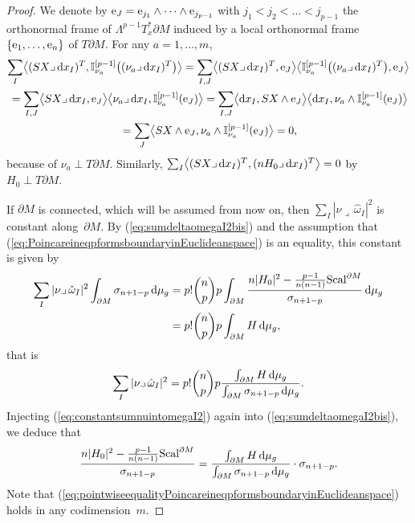 \begin{proof}
We denote by ${\rm e}_J={\rm e}_{j_1}\wedge\dots \wedge {\rm e}_{j_{p-1}}$ with $j_1<j_2<\dots<j_{p-1}$ the orthonormal frame of $\Lambda^{p-1}T_x^*\partial M$ induced by a local orthonormal frame $\{{\rm e}_1,\dots,{\rm e}_n\}$ of $T\partial M$.
For any $a=1,\dots,m$,
\begin{gather*}
\sum_I\bigl\langle (SX\lrcorner\,{\rm d}x_I)^T,\mathbb{I}_{\nu_a}^{[p-1]}\bigl((\nu_a\lrcorner\,{\rm d}x_I)^T\bigr)\bigr\rangle=\sum_{I,J}\bigl\langle (SX\lrcorner\,{\rm d}x_I)^T,{\rm e}_J\bigr\rangle \bigl\langle \mathbb{I}_{\nu_a}^{[p-1]}\bigl((\nu_a\lrcorner\,{\rm d}x_I)^T\bigr),{\rm e}_J\bigr\rangle\\
\hphantom{}=\sum_{I,J}\bigl\langle SX\lrcorner\,{\rm d}x_I,{\rm e}_J\bigr\rangle \bigl\langle \nu_a\lrcorner\,{\rm d}x_I,\mathbb{I}_{\nu_a}^{[p-1]}({\rm e}_J)\bigr\rangle
=\sum_{I,J}\bigl\langle {\rm d}x_I,SX\wedge {\rm e}_J\bigr\rangle \bigl\langle {\rm d}x_I,\nu_a\wedge \mathbb{I}_{\nu_a}^{[p-1]}({\rm e}_J)\bigr\rangle\\
\hphantom{}=\sum_{J}\bigl\langle SX\wedge {\rm e}_J,\nu_a\wedge \mathbb{I}_{\nu_a}^{[p-1]}({\rm e}_J)\bigr\rangle
=0,
\end{gather*}
because of $\nu_a\perp T\partial M$.
Similarly, $\sum_I\bigl\langle (SX\lrcorner\,{\rm d}x_I)^T,(nH_0\lrcorner\,{\rm d}x_I)^T\bigr\rangle=0$ by $H_0\perp T\partial M$.


If $\partial M$ is connected, which will be assumed from now on, then $\sum_I|\nu\lrcorner\,\hat{\omega}_I|^2$ is constant along~$\partial M$. By (\ref{eq:sumdeltaomegaI2bis}) and the assumption that (\ref{eq:PoincareineqpformsboundaryinEuclideanspace}) is an equality, this constant is given by
\begin{align*}
\sum_I|\nu\lrcorner\,\hat{\omega}_I|^2\int_{\partial M}\sigma_{n+1-p}\,{\rm d}\mu_g&= p!\binom{n}{p}p\int_{\partial M}\frac{n|H_0|^2-\frac{p-1}{n(n-1)}{\rm Scal}^{\partial M}}{\sigma_{n+1-p}}\,{\rm d}\mu_g\\
&= p!\binom{n}{p}p\int_{\partial M}H\,{\rm d}\mu_g,
\end{align*}
that is
\begin{equation}\label{eq:constantsumnuintomegaI2}
\sum_I|\nu\lrcorner\,\hat{\omega}_I|^2=p!\binom{n}{p}p\frac{\int_{\partial M}H\,{\rm d}\mu_g}{\int_{\partial M}\sigma_{n+1-p}\,{\rm d}\mu_g}.
\end{equation}
Injecting (\ref{eq:constantsumnuintomegaI2}) again  into (\ref{eq:sumdeltaomegaI2bis}), we deduce that
\begin{equation}\label{eq:pointwiseequalityPoincareineqpformsboundaryinEuclideanspace}
\frac{n|H_0|^2-\frac{p-1}{n(n-1)}{\rm Scal}^{\partial M}}{\sigma_{n+1-p}}=\frac{\int_{\partial M}H\,{\rm d}\mu_g}{\int_{\partial M}\sigma_{n+1-p}\,{\rm d}\mu_g}\cdot\sigma_{n+1-p}.
\end{equation}
Note that (\ref{eq:pointwiseequalityPoincareineqpformsboundaryinEuclideanspace}) holds in any codimension~$m$.


\end{proof}
